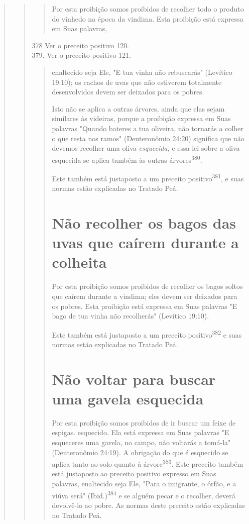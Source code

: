 \begin{quote}
\begin{quote}
\begin{quote}
Por esta proibição somos proibidos de recolher todo o produto do vinhedo
na época da vindima. Esta proibição está expressa em Suas palavras,
\end{quote}

378 Ver o preceito positivo 120.\\
379. Ver o preceito positivo 121.

\begin{quote}

enaltecido seja Ele, "E tua vinha não rebuscarás" (Levítico 19:10); os
cachos de uvas que não estiverem totalmente desenvolvidos devem ser
deixados para os pobres.

Isto não se aplica a outras árvores, ainda que elas sejam similares às
videiras, porque a proibição expressa em Suas palavras "Quando bateres a
tua oliveira, não tornarás a colher o que resta nos ramos" (Deuteronômio
24:20) significa que não devemos recolher uma oliva \emph{esquecida,} e
essa lei sobre a oli­va esquecida se aplica também às outras
árvores\textsuperscript{380}.

Este também está justaposto a um preceito positivo\textsuperscript{381},
e suas nor­mas estão explicadas no Tratado Peá.

\section{Não recolher os bagos das uvas que caírem durante a colheita}

Por esta proibição somos proibidos de recolher os bagos soltos que
caírem durante a vindima; eles devem ser deixados para os pobres. Esta
proibi­ção está expressa em Suas palavras "E bago de tua vinha não
recolherás" (Leví­tico 19:10).

Este também está justaposto a um preceito positivo\textsuperscript{382}
e suas nor­mas estão explicadas no Tratado Peá.

\section{Não voltar para buscar uma gavela esquecida}

Por esta proibição somos proibidos de ir buscar um feixe de espigas.
esquecido. Ela está expressa em Suas palavras "E esqueceres uma gavela,
no campo, não voltarás a tomá-la" (Deuteronômio 24:19). A obrigação do
que é esquecido se aplica tanto ao solo quanto à
árvore\textsuperscript{383}. Este preceito também está justaposto ao
preceito positivo expresso em Suas palavras, enaltecido seja Ele, "Para
o imigrante, o órfão, e a viúva será" (Ibid.)\textsuperscript{384} e se
alguém pecar e o re­colher, deverá devolvê-lo ao pobre. As normas deste
preceito estão explicadas no Tratado Peá.


\end{quote}
\end{quote}
\end{quote}
